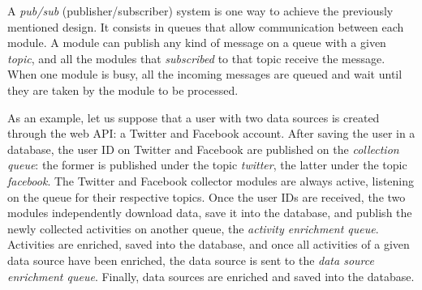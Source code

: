 A \emph{pub/sub} (publisher/subscriber) system is one way to achieve the previously mentioned design. It consists in queues that allow communication between each module. A module can publish any kind of message on a queue with a given \emph{topic}, and all the modules that \emph{subscribed} to that topic receive the message. When one module is busy, all the incoming messages are queued and wait until they are taken by the module to be processed.

As an example, let us suppose that a user with two data sources is created through the web API: a Twitter and Facebook account. After saving the user in a database, the user ID on Twitter and Facebook are published on the \emph{collection queue}: the former is published under the topic \emph{twitter}, the latter under the topic \emph{facebook}. The Twitter and Facebook collector modules are always active, listening on the queue for their respective topics. Once the user IDs are received, the two modules independently download data, save it into the database, and publish the newly collected activities on another queue, the \emph{activity enrichment queue}. Activities are enriched, saved into the database, and once all activities of a given data source have been enriched, the data source is sent to the \emph{data source enrichment queue}. Finally, data sources are enriched and saved into the database.